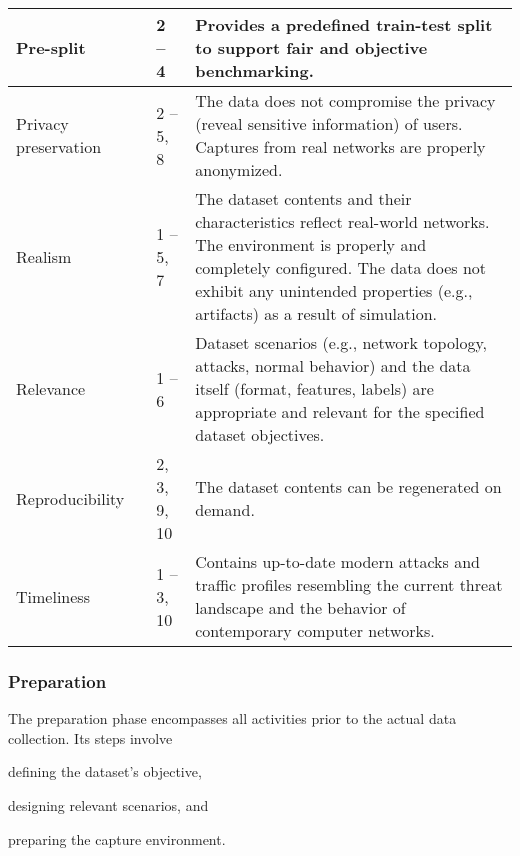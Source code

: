 \begin{table*}[t]
\begin{tabular}{p{2.5cm} p{2.1cm} p{1.8cm} p{10cm}}
    Pre-split & \cite{ring2019_nids_datasets_survey} & 2 -- 4 & Provides a predefined train-test split to support fair and objective benchmarking. \\ \midrule
    \makecell[tl]{Privacy\\preservation} & \cite{ferriyan2021_hikari2021, ring2019_nids_datasets_survey, viegas2017_trabid_dataset} & 2 -- 5, 8 & The data does not compromise the privacy (reveal sensitive information) of users. Captures from real networks are properly anonymized. \\ \midrule
    Realism & \cite{apruzzese2023_role_of_ml_cybersec,myneni2023_unraveled,viegas2017_trabid_dataset,shiravi2012_iscx2012} & 1 -- 5, 7 & The dataset contents and their characteristics reflect real-world networks. The environment is properly and completely configured. The data does not exhibit any unintended properties (e.g., artifacts) as a result of simulation. \\ \midrule
    Relevance & \cite{landauer2023_ait_ldsv2_dataset,ring2019_nids_datasets_survey,ring2017_cidds002} & 1 -- 6 & Dataset scenarios (e.g., network topology, attacks, normal behavior) and the data itself (format, features, labels) are appropriate and relevant for the specified dataset objectives. \\ \midrule
    Reproducibility & \cite{catillo2021_demystifying_public_ids_data,landauer2023_ait_ldsv2_dataset, lewandowski2023_guidelines_nids_datasets} & 2, 3, 9, 10 & The dataset contents can be regenerated on demand. \\ \midrule
    Timeliness & \cite{apruzzese2023_role_of_ml_cybersec,ring2019_nids_datasets_survey,malowidzki2015_network} & 1 -- 3, 10 & Contains up-to-date modern attacks and traffic profiles resembling the current threat landscape and the behavior of contemporary computer networks. \\ \bottomrule
    \end{tabular}
    \label{tab:dataset_desirable_props}
\end{table*}

\subsubsection{Preparation}

The preparation phase encompasses all activities prior to the actual data collection. Its steps involve
\begin{enumerate*}[label=\alph*)]
    \item defining the dataset's objective,
    \item designing relevant scenarios, and
    \item preparing the capture environment.
\end{enumerate*}

